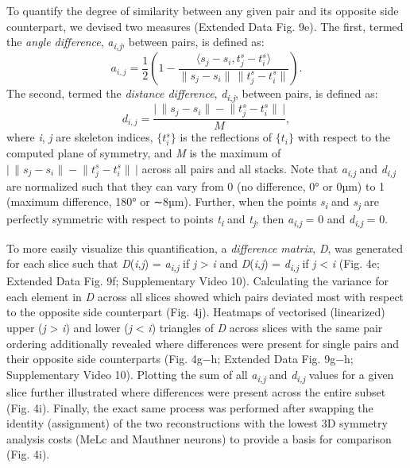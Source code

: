 \documentclass{article}
\begin{document}
To quantify the degree of similarity between any given pair and its opposite side counterpart, we devised two measures (Extended Data Fig. 9e). The first, termed the \textit{angle difference}, \textit{a}\textsubscript{\textit{i,j}}, between pairs, is defined as:
\[ a_{i,j} = \frac{1}{2}\left(1 - \frac{\langle s_j - s_i, t_j^s - t_i^s \rangle}{\lVert s_j - s_i \rVert \, \lVert t_j^s - t_i^s \rVert}\right). \]
The second, termed the \textit{distance difference}, \textit{d}\textsubscript{\textit{i,j}}, between pairs, is defined as:
\[ d_{i,j} = \frac{\bigl|\, \lVert s_j - s_i \rVert - \lVert t_j^s - t_i^s \rVert \,\bigr|}{M}, \]
where \textit{i}, \textit{j} are skeleton indices, $\{t_i^s\}$ is the reflections of $\{t_i\}$ with respect to the computed plane of symmetry, and \textit{M} is the maximum of $\bigl|\, \lVert s_j - s_i \rVert - \lVert t_j^s - t_i^s \rVert \,\bigr|$ across all pairs and all stacks. Note that \textit{a}\textsubscript{\textit{i,j}} and \textit{d}\textsubscript{\textit{i,j}} are normalized such that they can vary from 0 (no difference, 0° or 0µm) to 1 (maximum difference, 180° or ∼8µm). Further, when the points \textit{s}\textsubscript{\textit{i}} and \textit{s}\textsubscript{\textit{j}} are perfectly symmetric with respect to points \textit{t}\textsubscript{\textit{i}} and \textit{t}\textsubscript{\textit{j}}, then \textit{a}\textsubscript{\textit{i,j}} = 0 and \textit{d}\textsubscript{\textit{i,j}} = 0.

To more easily visualize this quantification, a \textit{difference matrix}, \textit{D}, was generated for each slice such that \textit{D}(\textit{i},\textit{j}) = \textit{a}\textsubscript{\textit{i,j}} if \textit{j} > \textit{i} and \textit{D}(\textit{i},\textit{j}) = \textit{d}\textsubscript{\textit{i,j}} if \textit{j} < \textit{i} (Fig. 4e; Extended Data Fig. 9f; Supplementary Video 10). Calculating the variance for each element in \textit{D} across all slices showed which pairs deviated most with respect to the opposite side counterpart (Fig. 4j). Heatmaps of vectorised (linearized) upper (\textit{j} > \textit{i}) and lower (\textit{j} < \textit{i}) triangles of \textit{D} across slices with the same pair ordering additionally revealed where differences were present for single pairs and their opposite side counterparts (Fig. 4g−h; Extended Data Fig. 9g−h; Supplementary Video 10). Plotting the sum of all \textit{a}\textsubscript{\textit{i,j}} and \textit{d}\textsubscript{\textit{i,j}} values for a given slice further illustrated where differences were present across the entire subset (Fig. 4i). Finally, the exact same process was performed after swapping the identity (assignment) of the two reconstructions with the lowest 3D symmetry analysis costs (MeLc and Mauthner neurons) to provide a basis for comparison (Fig. 4i).
\end{document}
